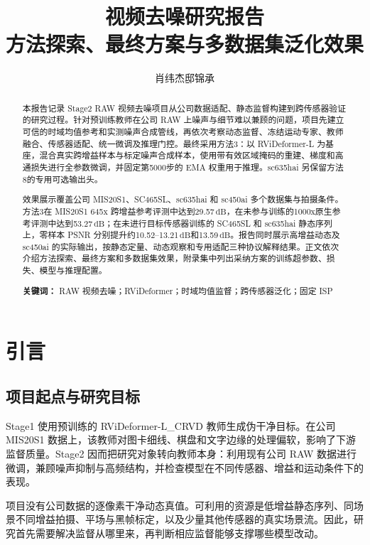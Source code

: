 \documentclass[11pt,a4paper,UTF8,fontset=fandol]{ctexart}
\title{\textbf{视频去噪研究报告}\\[0.4em]
\large 方法探索、最终方案与多数据集泛化效果}
\author{肖纬杰\quad 邸锦承}
\date{}
\newcommand{\db}{\ensuremath{\,\mathrm{dB}}}
\begin{document}
\maketitle
\begin{abstract}
\noindent
本报告记录 Stage2 RAW 视频去噪项目从公司数据适配、静态监督构建到跨传感器验证的研究过程。针对预训练教师在公司 RAW 上噪声与细节难以兼顾的问题，项目先建立可信的时域均值参考和实测噪声合成管线，再依次考察动态监督、冻结运动专家、教师融合、传感器适配、统一微调及推理门控。最终采用方法3：以 RViDeformer-L 为基座，混合真实跨增益样本与标定噪声合成样本，使用带有效区域掩码的重建、梯度和高通损失进行全参数微调，并固定第5000步的 EMA 权重用于推理。sc635hai 另保留方法8的专用可选输出头。

效果展示覆盖公司 MIS20S1、SC465SL、sc635hai 和 sc450ai 多个数据集与拍摄条件。方法3在 MIS20S1 645x 跨增益参考评测中达到29.57\db，在未参与训练的1000x原生参考评测中达到53.27\db；在未进行目标传感器训练的 SC465SL 和 sc635hai 静态序列上，零样本 PSNR 分别提升约10.52--13.21\db 和13.59\db。报告同时展示高增益动态及 sc450ai 的实际输出，按静态定量、动态观察和专用适配三种协议解释结果。正文依次介绍方法探索、最终方案和多数据集效果，附录集中列出采纳方案的训练超参数、损失、模型与推理配置。

\vspace{0.6em}
\noindent\textbf{关键词：} RAW 视频去噪；RViDeformer；时域均值监督；跨传感器泛化；固定 ISP
\end{abstract}

\newpage
\tableofcontents
\newpage

\section{引言}

\subsection{项目起点与研究目标}

Stage1 使用预训练的 RViDeformer-L\_CRVD 教师生成伪干净目标。在公司 MIS20S1 数据上，该教师对图卡细线、棋盘和文字边缘的处理偏软，影响了下游监督质量。Stage2 因而把研究对象转向教师本身：利用现有公司 RAW 数据进行微调，兼顾噪声抑制与高频结构，并检查模型在不同传感器、增益和运动条件下的表现。

项目没有公司数据的逐像素干净动态真值。可利用的资源是低增益静态序列、同场景不同增益拍摄、平场与黑帧标定，以及少量其他传感器的真实场景流。因此，研究首先需要解决监督从哪里来，再判断相应监督能够支撑哪些模型改动。
\end{document}
